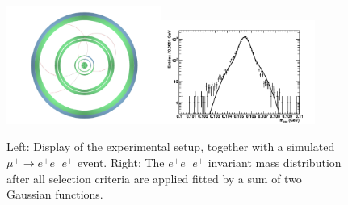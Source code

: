 \begin{figure}[htb]
\begin{center}
\includegraphics[width=0.45\textwidth]{ChargedLeptons/Figures/event.pdf}\includegraphics[width=0.45\textwidth]{ChargedLeptons/Figures/resoFit.pdf}
\end{center}
\caption{Left: Display of the experimental setup, together with a simulated $\mu^+ \rightarrow e^+e^-e^+$ event. 
Right:  The $e^+e^-e^+$ invariant mass distribution after all selection criteria are applied fitted by a 
sum of two Gaussian functions.}
\label{Fig::mu3e}
\end{figure}




